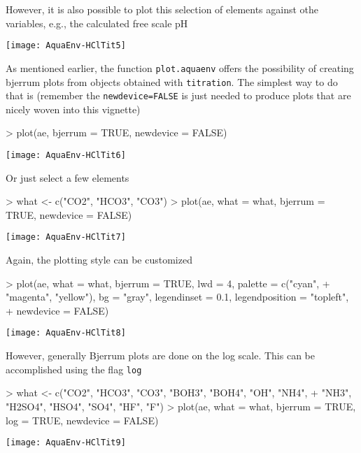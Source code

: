 \documentclass[article,nojss]{jss}
\begin{document}
However, it is also possible to plot this selection of elements against othe variables, e.g., the calculated free scale pH
\begin{Schunk}
\end{Schunk}
\texttt{[image: AquaEnv-HClTit5]}

As mentioned earlier, the function \texttt{plot.aquaenv} offers the possibility of creating bjerrum plots from objects obtained with \texttt{titration}.
The simplest way to do that is (remember the \texttt{newdevice=FALSE} is just needed to produce plots that are nicely woven into this vignette)
\begin{Schunk}
\begin{Sinput}
> plot(ae, bjerrum = TRUE, newdevice = FALSE)
\end{Sinput}
\end{Schunk}
\texttt{[image: AquaEnv-HClTit6]}

Or just select a few elements
\begin{Schunk}
\begin{Sinput}
> what <- c("CO2", "HCO3", "CO3")
> plot(ae, what = what, bjerrum = TRUE, newdevice = FALSE)
\end{Sinput}
\end{Schunk}
\texttt{[image: AquaEnv-HClTit7]}

Again, the plotting style can be customized
\begin{Schunk}
\begin{Sinput}
> plot(ae, what = what, bjerrum = TRUE, lwd = 4, palette = c("cyan", 
+     "magenta", "yellow"), bg = "gray", legendinset = 0.1, legendposition = "topleft", 
+     newdevice = FALSE)
\end{Sinput}
\end{Schunk}
\texttt{[image: AquaEnv-HClTit8]}

However, generally Bjerrum plots are done on the log scale. This can be accomplished using the flag \texttt{log}
\begin{Schunk}
\begin{Sinput}
> what <- c("CO2", "HCO3", "CO3", "BOH3", "BOH4", "OH", "NH4", 
+     "NH3", "H2SO4", "HSO4", "SO4", "HF", "F")
> plot(ae, what = what, bjerrum = TRUE, log = TRUE, newdevice = FALSE)
\end{Sinput}
\end{Schunk}
\texttt{[image: AquaEnv-HClTit9]}
\end{document}
